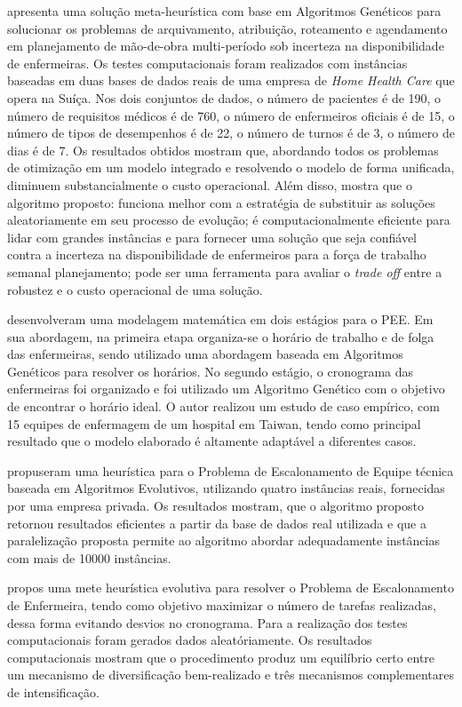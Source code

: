 \cite{nguyen:2016} apresenta uma solução meta-heurística com base em Algoritmos Genéticos para solucionar os problemas de arquivamento, atribuição, roteamento e agendamento em planejamento de mão-de-obra multi-período sob incerteza na disponibilidade de enfermeiras. Os testes computacionais foram realizados com instâncias baseadas em duas bases de dados reais de uma empresa de \textit{Home Health Care} que opera na Suíça. Nos dois conjuntos de dados, o número de pacientes é de 190, o número de requisitos médicos é de 760, o número de enfermeiros oficiais é de 15, o número de tipos de desempenhos é de 22, o número de turnos é de 3, o número de dias é de 7. Os resultados obtidos mostram que, abordando todos os problemas de otimização em um modelo integrado e resolvendo o modelo de forma unificada, diminuem substancialmente o custo operacional. Além disso, mostra que o algoritmo proposto: funciona melhor com a estratégia de substituir as soluções aleatoriamente em seu processo de evolução; é computacionalmente eficiente para lidar com grandes instâncias e para fornecer uma solução que seja confiável contra a incerteza na disponibilidade de enfermeiros para a força de trabalho semanal planejamento; pode ser uma ferramenta para avaliar o \textit{trade off} entre a robustez e o custo operacional de uma solução.

\cite{tsai:2009} desenvolveram uma modelagem matemática em dois estágios para o \ac{PEE}. Em sua abordagem, na primeira etapa organiza-se o horário de trabalho e de folga das enfermeiras,  sendo utilizado uma abordagem baseada em Algoritmos Genéticos para resolver os horários. No segundo estágio, o cronograma das enfermeiras foi organizado e foi utilizado um  Algoritmo Genético com o objetivo de encontrar o horário ideal. O autor realizou um estudo de caso empírico, com 15 equipes de enfermagem de um hospital em Taiwan, tendo como principal resultado que o modelo elaborado é altamente adaptável a diferentes casos.

 \cite{luna:2013} propuseram uma heurística para o Problema de Escalonamento de Equipe técnica baseada em Algoritmos Evolutivos, utilizando quatro instâncias reais, fornecidas por uma empresa privada. Os resultados mostram,  que o algoritmo proposto retornou resultados eficientes a partir da base de dados real utilizada e  que a paralelização proposta permite ao algoritmo abordar adequadamente instâncias com mais de 10000 instâncias. 
 
\cite{maenhout:2011} propos uma mete heurística evolutiva para resolver o Problema de Escalonamento de Enfermeira, tendo como objetivo maximizar o número de tarefas realizadas, dessa forma evitando desvios no cronograma. Para a realização dos testes computacionais foram gerados dados aleatóriamente. Os resultados computacionais mostram que o procedimento produz um equilíbrio certo entre um mecanismo de diversificação bem-realizado e três mecanismos complementares de intensificação. 

